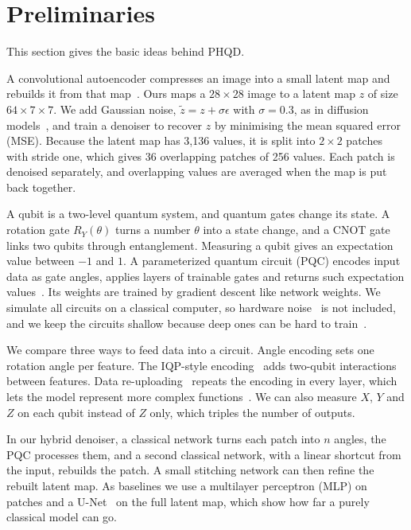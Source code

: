 \documentclass[runningheads]{llncs}
\begin{document}
\section{Preliminaries}\label{sec:prelim}
This section gives the basic ideas behind PHQD.

A convolutional autoencoder compresses an image into a small latent map and rebuilds it from that map~\cite{rombach}. Ours maps a $28\times28$ image to a latent map $z$ of size $64\times7\times7$. We add Gaussian noise, $\tilde z=z+\sigma\epsilon$ with $\sigma=0.3$, as in diffusion models~\cite{ho}, and train a denoiser to recover $z$ by minimising the mean squared error (MSE). Because the latent map has 3,136 values, it is split into $2\times2$ patches with stride one, which gives 36 overlapping patches of 256 values. Each patch is denoised separately, and overlapping values are averaged when the map is put back together.

A qubit is a two-level quantum system, and quantum gates change its state. A rotation gate $R_Y(\theta)$ turns a number $\theta$ into a state change, and a CNOT gate links two qubits through entanglement. Measuring a qubit gives an expectation value between $-1$ and $1$. A parameterized quantum circuit (PQC) encodes input data as gate angles, applies layers of trainable gates and returns such expectation values~\cite{cerezo,benedetti}. Its weights are trained by gradient descent like network weights. We simulate all circuits on a classical computer, so hardware noise~\cite{preskill} is not included, and we keep the circuits shallow because deep ones can be hard to train~\cite{mcclean}.

We compare three ways to feed data into a circuit. Angle encoding sets one rotation angle per feature. The IQP-style encoding~\cite{havlicek} adds two-qubit interactions between features. Data re-uploading~\cite{salinas} repeats the encoding in every layer, which lets the model represent more complex functions~\cite{schuld}. We can also measure $X$, $Y$ and $Z$ on each qubit instead of $Z$ only, which triples the number of outputs.

In our hybrid denoiser, a classical network turns each patch into $n$ angles, the PQC processes them, and a second classical network, with a linear shortcut from the input, rebuilds the patch. A small stitching network can then refine the rebuilt latent map. As baselines we use a multilayer perceptron (MLP) on patches and a U-Net~\cite{unet} on the full latent map, which show how far a purely classical model can go.
\end{document}
